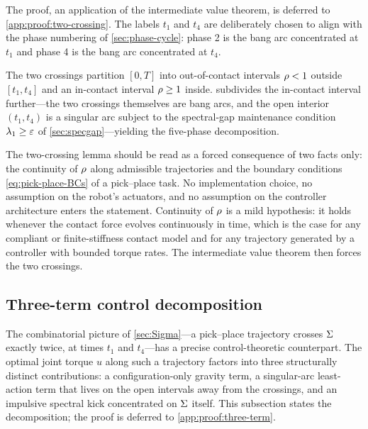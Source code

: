 The proof, an application of the intermediate value theorem,
is deferred to \cref{app:proof:two-crossing}. The
labels $t_{1}$ and $t_{4}$ are deliberately chosen to align
with the phase numbering of \cref{sec:phase-cycle}: phase 2 is
the bang arc concentrated at $t_{1}$ and phase 4 is the bang
arc concentrated at $t_{4}$.

The two crossings partition $[0, T]$ into out-of-contact
intervals $\rho < 1$ outside $[t_{1}, t_{4}]$ and an
in-contact interval $\rho \ge 1$ inside.
 subdivides the in-contact interval
further---the two crossings themselves are bang arcs, and the
open interior $(t_{1}, t_{4})$ is a singular arc subject to
the spectral-gap maintenance condition $\lambda_{1} \ge
\varepsilon$ of \cref{sec:specgap}---yielding the five-phase
decomposition.

The two-crossing lemma should be read as a forced
consequence of two facts only: the continuity of $\rho$
along admissible trajectories and the boundary conditions
\eqref{eq:pick-place-BCs} of a pick--place task. No
implementation choice, no assumption on the robot's actuators,
and no assumption on the controller architecture enters the
statement. Continuity of $\rho$ is a mild hypothesis: it
holds whenever the contact force evolves continuously in time,
which is the case for any compliant or finite-stiffness contact
model and for any trajectory generated by a controller with
bounded torque rates. The intermediate value theorem
\citep{Rudin1976} then forces the two crossings.

\subsection{Three-term control decomposition}
\label{sec:three-term}

The combinatorial picture of \cref{sec:Sigma}---a pick--place
trajectory crosses $\Sigma$ exactly twice, at times $t_{1}$
and $t_{4}$---has a precise control-theoretic counterpart. The
optimal joint torque $u$ along such a trajectory factors into
three structurally distinct contributions: a configuration-only
gravity term, a singular-arc least-action term that lives on
the open intervals away from the crossings, and an impulsive
spectral kick concentrated on $\Sigma$ itself. This subsection
states the decomposition; the proof is deferred to
\cref{app:proof:three-term}.

